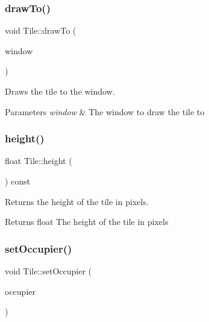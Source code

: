 \subsubsection{\texorpdfstring{drawTo()}{drawTo()}}
{\footnotesize\ttfamily void Tile\+::draw\+To (\begin{DoxyParamCaption}\item[{sf\+::\+Render\+Window \&}]{window }\end{DoxyParamCaption})\hspace{0.3cm}{\ttfamily [virtual]}}



Draws the tile to the window. 


\begin{DoxyParams}{Parameters}
{\em window} & The window to draw the tile to \\
\hline
\end{DoxyParams}
\mbox{\label{classTile_a93878ba24748c81017215d97efd1a2f0}} 
\subsubsection{\texorpdfstring{height()}{height()}}
{\footnotesize\ttfamily float Tile\+::height (\begin{DoxyParamCaption}{ }\end{DoxyParamCaption}) const}



Returns the height of the tile in pixels. 

\begin{DoxyReturn}{Returns}
float The height of the tile in pixels 
\end{DoxyReturn}
\mbox{\label{classTile_ace2e0e7d2aacf0190bcf10bf34a0c9f2}} 
\subsubsection{\texorpdfstring{setOccupier()}{setOccupier()}}
{\footnotesize\ttfamily void Tile\+::set\+Occupier (\begin{DoxyParamCaption}\item[{\mbox{\hyperlink{classActor}{Actor}} $\ast$}]{occupier }\end{DoxyParamCaption})}



